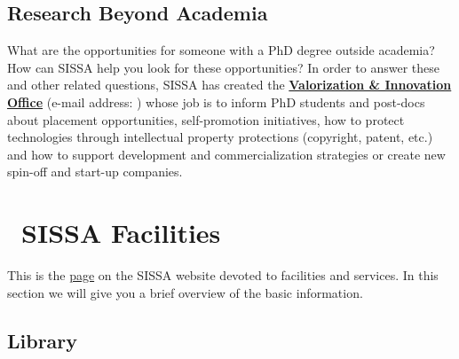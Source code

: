 \documentclass{sissavademecum}
\begin{document}
\section{Research Beyond Academia}

What are the opportunities for someone with a PhD degree outside academia? How can SISSA help you look for these opportunities? In order to answer these and other related questions, SISSA has created the \href{https://www.sissa.it/technology-transfer/}{\textbf{Valorization \& Innovation Office}} (e-mail address: ) whose job is to inform PhD students and post-docs about placement opportunities, self-promotion initiatives, how to protect technologies through intellectual property protections (copyright, patent, etc.) and how to support development and commercialization strategies or create new spin-off and start-up companies.


\chapter{\texorpdfstring{\faUniversity\ }{}SISSA Facilities}

This is the \href{https://www.sissa.it/facilities-and-services}{page} on the SISSA website devoted to facilities and services. In this section we will give you a brief overview of the basic information.


\section{Library}
\label{sec:Library}
\end{document}
